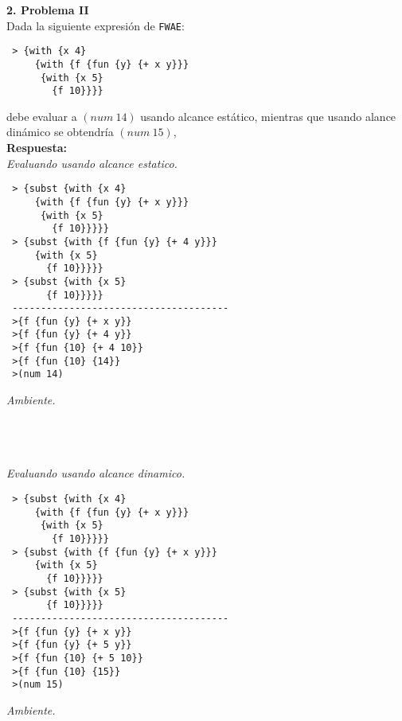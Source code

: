 \documentclass[letterpaper,11pt]{article}
\begin{document}
 {\bf 2. Problema II}
 \\
 Dada la siguiente expresión de \texttt{FWAE}:
 \begin{verbatim}
 > {with {x 4}
     {with {f {fun {y} {+ x y}}}
      {with {x 5}
        {f 10}}}}
 \end{verbatim}
 debe evaluar a $(num\ 14)$ usando alcance estático, mientras que usando alance  dinámico se obtendría $(num\ 15)$, 
 \\
\textbf{Respuesta:} 
\\
\textit{Evaluando usando alcance estatico.}
 \begin{verbatim}
 > {subst {with {x 4}
     {with {f {fun {y} {+ x y}}}
      {with {x 5}
        {f 10}}}}}
 > {subst {with {f {fun {y} {+ 4 y}}}
     {with {x 5}
       {f 10}}}}}
 > {subst {with {x 5}
       {f 10}}}}}
 --------------------------------------
 >{f {fun {y} {+ x y}}
 >{f {fun {y} {+ 4 y}}
 >{f {fun {10} {+ 4 10}}
 >{f {fun {10} {14}}
 >(num 14) 
 \end{verbatim}
\textit{Ambiente.}
\\
\\
\\
\\
\textit{Evaluando usando alcance dinamico.}
 \begin{verbatim}
 > {subst {with {x 4}
     {with {f {fun {y} {+ x y}}}
      {with {x 5}
        {f 10}}}}}
 > {subst {with {f {fun {y} {+ x y}}}
     {with {x 5}
       {f 10}}}}}
 > {subst {with {x 5}
       {f 10}}}}}
 --------------------------------------
 >{f {fun {y} {+ x y}}
 >{f {fun {y} {+ 5 y}}
 >{f {fun {10} {+ 5 10}}
 >{f {fun {10} {15}}
 >(num 15) 
 \end{verbatim}
\textit{Ambiente.}
\\
\\
\\
\end{document}
